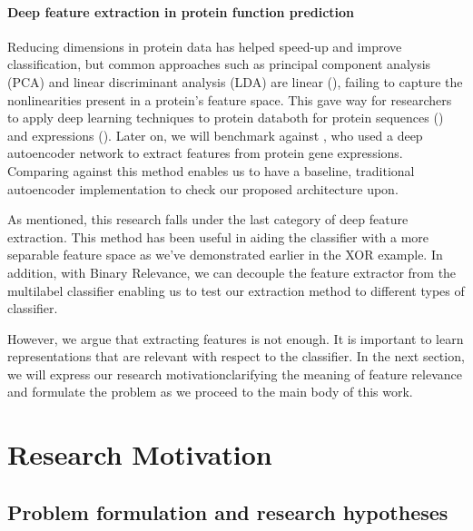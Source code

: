 \paragraph{Deep feature extraction in protein function prediction} Reducing
dimensions in protein data has helped speed-up and improve classification,
but common approaches such as principal component analysis (PCA) and linear
discriminant analysis (LDA) are linear (\cite{bengio2013representation}),
failing to capture the nonlinearities present in a protein's feature space.
This gave way for researchers to apply deep learning techniques to protein
data\textemdash both for protein sequences
(\cite{bhola2014machine,kulmanov2017deepgo, zou2017protein}) and expressions
(\cite{baldi2001bioinformatics, chicco2014deep}). Later on, we will benchmark
against \cite{chicco2014deep}, who used a deep autoencoder network to extract
features from protein gene expressions. Comparing against this method enables
us to have a baseline, traditional autoencoder implementation to check our
proposed architecture upon.

\newpage
\par As mentioned, this research falls under the last category of deep
feature extraction. This method has been useful in aiding the classifier with
a more separable feature space as we've demonstrated earlier in the XOR
example. In addition, with Binary Relevance, we can decouple the feature
extractor from the multilabel classifier enabling us to test our extraction
method to different types of classifier.


\par However, we argue that extracting features is not enough. It is
important to learn representations that are relevant with respect to the
classifier. In the next section, we will express our research
motivation\textemdash clarifying the meaning of feature relevance\textemdash
and formulate the problem as we proceed to the main body of this work.

\section{Research Motivation}
\label{Motivation}


\subsection{Problem formulation and research hypotheses}

